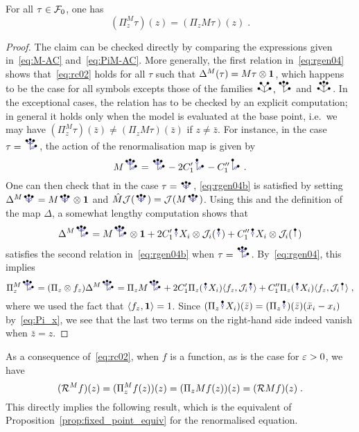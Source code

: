 \documentclass[reqno,11pt]{article}
\def\unit{\vone}
\begin{document}
\begin{lemma}
\label{lem:PizM}
For all $\tau\in{\mathcal F}_0$, one has 
\begin{equation}
 \label{eq:rc02}
 (\Pi^M_z\tau)(z) = (\Pi_z M\tau)(z)\;.
\end{equation} 
\end{lemma}
%
\begin{proof}
The claim can be checked directly by comparing the expressions given
in~\eqref{eq:M-AC} and~\eqref{eq:PiM-AC}. More generally, the first relation
in~\eqref{eq:rgen04} shows that~\eqref{eq:rc02} holds for all $\tau$ such that
$\Delta^M(\tau) = M\tau\otimes\unit$, which happens to be the case for all
symbols excepts those of the families $\RSWV, \RSVW$ and $\RSWW$. In the
exceptional cases, the relation has to be checked by an explicit computation; in
general it holds only when the model is evaluated at the base point, i.e.\ we
may have $(\Pi^M_z\tau)(\bar z) \neq (\Pi_z M\tau)(\bar z)$ if $z\neq\bar z$.
For instance, in the case $\tau=\RSVoWoo$, the action of the renormalisation
map is given by 
\[
 M\RSVoWoo = \RSVoWoo -2C_1'\RSVoIo -C_1''\RSVoI\;.
\]
One can then check that in the case $\tau=\RSWoo$, \eqref{eq:rgen04b} is
satisfied by setting $\Delta^M\RSWoo=M\RSWoo\otimes\unit$ and $\hat
M\cJ(\RSWoo)=\cJ(M\RSWoo)$. Using this and the definition of the map $\Delta$,
a somewhat lengthy computation shows that 
\[
 \Delta^M \RSVoWoo = M\RSVoWoo\otimes\unit + 2C_1'\RSoI
X_i\otimes\cJ_i(\RSoI) + C_1''\RSoI X_i\otimes\cJ_i(\RSI)
\]
satisfies the second relation in~\eqref{eq:rgen04b} when $\tau=\RSVoWoo$. 
By~\eqref{eq:rgen04}, this implies 
\[
 \Pi_z^M\RSVoWoo = (\Pi_z\otimes f_z)\Delta^M\RSVoWoo
 = \Pi_z M\RSVoWoo + 2C_1'\Pi_z(\RSoI X_i)\pscal{f_z}{\cJ_i\RSoI}
 + C_1''\Pi_z(\RSoI X_i)\pscal{f_z}{\cJ_i\RSI}\;,
\]
where we used the fact that $\pscal{f_z}{\unit}=1$.
Since $(\Pi_z\RSoI X_i)(\bar z) = (\Pi_z\RSoI)(\bar z)(\bar x_i-x_i)$
by~\eqref{eq:Pi_x}, we see that the last two terms on the right-hand side indeed
vanish when $\bar z=z$.
\end{proof}

As a consequence of~\eqref{eq:rc02}, when $f$ is a function, as is the case for
$\varepsilon>0$, we have 
\begin{equation}
 \label{eq:rc03}
 (\cR^M f)(z) = (\Pi^M_z f(z))(z) = (\Pi_z Mf(z))(z) = (\cR Mf)(z)\;.
\end{equation} 
This directly implies the following result, which is the equivalent of 
Proposition~\ref{prop:fixed_point_equiv} for the renormalised equation. 
\end{document}

